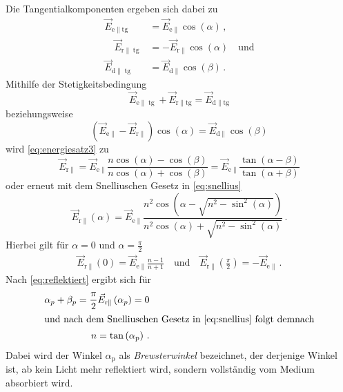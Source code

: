 Die Tangentialkomponenten ergeben sich dabei zu
\begin{align*}
    \vec{E}_{\mathrm{e} \| \mathrm{tg}} &= \vec{E}_{\mathrm{e} \|} \cos (\alpha) \, , \\
     \quad \vec{E}_{\mathrm{r} \| \operatorname{tg}} &= -\vec{E}_{\mathrm{r} \|} \cos (\alpha) \quad \text{und} \\ 
     \vec{E}_{\mathrm{d} \| \operatorname{tg}} &= \vec{E}_{\mathrm{d} \|} \cos (\beta) \, .
\end{align*}
Mithilfe der Stetigkeitsbedingung
\begin{equation*}
    \vec{E}_{\mathrm{e} \| \operatorname{tg}}+\vec{E}_{\mathrm{r} \| \mathrm{tg}}=\vec{E}_{\mathrm{d} \| \mathrm{tg}}
\end{equation*}
beziehungsweise
\begin{equation}
    \left(\vec{E}_{\mathrm{e} \|}-\vec{E}_{\mathrm{r} \|}\right) \cos (\alpha)=\vec{E}_{\mathrm{d} \|} \cos (\beta)
\end{equation}
wird \autoref{eq:energiesatz3} zu
\begin{equation} \label{eq:reflektiert}
    \vec{E}_{\mathrm{r} \|} 
    = \vec{E}_{\mathrm{e} \|} \frac{n \cos (\alpha)-\cos (\beta)}{n \cos (\alpha)+\cos (\beta)}
    = \vec{E}_{\mathrm{e} \|} \frac{\tan (\alpha-\beta)}{\tan (\alpha+\beta)}
\end{equation}
oder erneut mit dem Snelliuschen Gesetz in \autoref{eq:snellius}
\begin{equation} \label{eq:r_parallel}
    \vec{E}_{\mathrm{r} \|}(\alpha)=\vec{E}_{\mathrm{e} \|} \frac{n^{2} \cos \left(\alpha-\sqrt{n^{2}-\sin ^{2}(\alpha)}\right)}{n^{2} \cos (\alpha)+\sqrt{n^{2}-\sin ^{2}(\alpha)}} \, .
\end{equation}
Hierbei gilt für $\alpha = 0$ und $\alpha = \frac{\pi}{2}$
\begin{align*}
    \vec{E}_{\mathrm{r} \|}(0)=\vec{E}_{\mathrm{e} \|} \frac{n-1}{n+1} 
    \quad \text{und} \quad
    \vec{E}_{\mathrm{r} \|}\left(\frac{\pi}{2}\right)=-\vec{E}_{\mathrm{e} \|} \, .
\end{align*}
Nach \autoref{eq:reflektiert} ergibt sich für
\begin{align*}
    \alpha_{p} + \beta_{p} = \frac{\pi}{2} \vec{E}_{\mathrm{r} \|}\left(\alpha_{p}\right) = 0 \\
    \intertext{und nach dem Snelliuschen Gesetz in \autoref{eq:snellius} folgt demnach}
    n = \tan \left(\alpha_{\text{p}}\right) \, .
\end{align*}
Dabei wird der Winkel $\alpha_\text{p}$ als \textit{Brewsterwinkel} bezeichnet,
der derjenige Winkel ist, ab kein Licht mehr reflektiert wird, sondern vollständig vom Medium absorbiert wird.  
